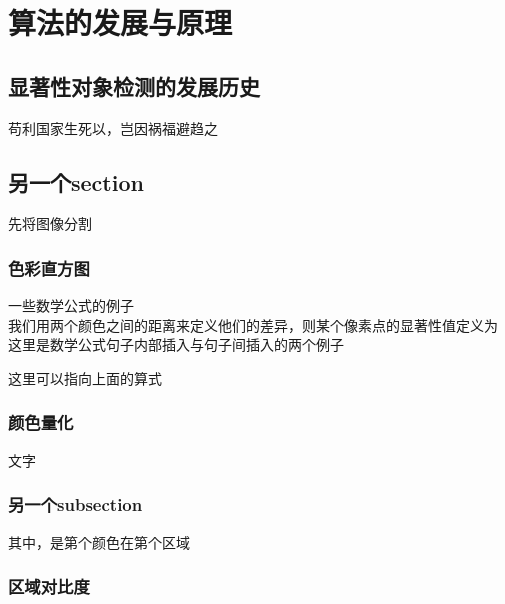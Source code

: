 \chapter{算法的发展与原理}

\section{显著性对象检测的发展历史}

苟利国家生死以，岂因祸福避趋之\cite{730558}
\section{另一个section}

先将图像分割 \cite{Felzenszwalb:2004:EGI:981793.981796}

\subsection{色彩直方图}

一些数学公式的例子\\

我们用两个颜色之间的距离来定义他们的差异，则某个像素点的显著性值定义为
这里是数学公式句子内部插入与句子间插入的两个例子


这里可以指向上面的算式


\subsection{颜色量化}

文字

\subsection{另一个subsection}

其中，是第个颜色在第个区域


\subsection{区域对比度}

